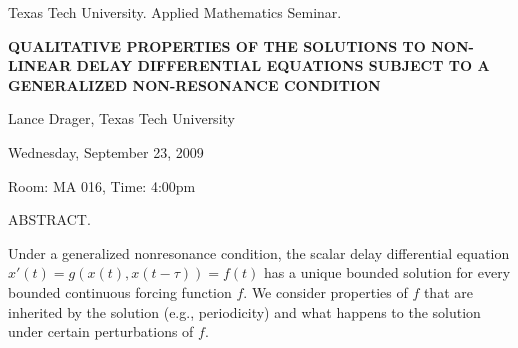 \documentclass[oneside]{amsart}
\newcommand{\talktitle}{\uppercase{Qualitative Properties of the Solutions to Non-linear Delay Differential Equations Subject to A Generalized Non-resonance Condition}}
\newcommand{\talkspeaker}{Lance Drager, Texas Tech University}
\newcommand{\talkdate}{Wednesday, September 23, 2009}
\newcommand{\talkabstract}{
Under a generalized nonresonance condition, the scalar delay differential equation $x'(t)=g(x(t),x(t-\tau))=f(t)$
has a unique bounded solution for every bounded continuous forcing function $f$.  We consider properties of
$f$ that are inherited by the solution (e.g., periodicity) and what happens to the solution under certain
perturbations of $f$.
}
\begin{document}
\thispagestyle{empty}

\begin{center}
Texas Tech University.  Applied Mathematics Seminar.

\end{center}

\begin{center}

\textbf{\LARGE \talktitle}

\talkspeaker

\talkdate

Room: MA 016, Time: 4:00pm

\end{center}

ABSTRACT.
\talkabstract
\end{document}
